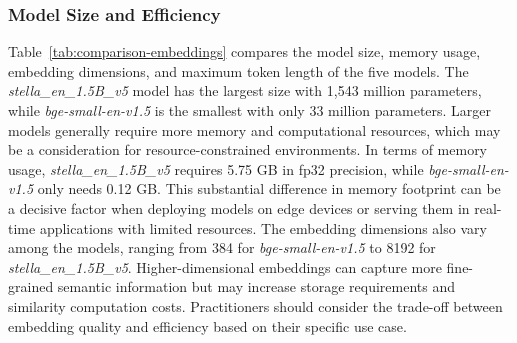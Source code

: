 \subsubsection{Model Size and Efficiency}
Table~\ref{tab:comparison-embeddings} compares the model size, memory usage, embedding dimensions, and maximum token length of the five models. 
The \textit{stella\_en\_1.5B\_v5} model has the largest size with 1,543 million parameters, while \textit{bge-small-en-v1.5} is the smallest with only 33 million parameters.
Larger models generally require more memory and computational resources, which may be a consideration for resource-constrained environments.
In terms of memory usage, \textit{stella\_en\_1.5B\_v5} requires 5.75 GB in fp32 precision, while \textit{bge-small-en-v1.5} only needs 0.12 GB.
This substantial difference in memory footprint can be a decisive factor when deploying models on edge devices or serving them in real-time applications with limited resources.
The embedding dimensions also vary among the models, ranging from 384 for \textit{bge-small-en-v1.5} to 8192 for \textit{stella\_en\_1.5B\_v5}.
Higher-dimensional embeddings can capture more fine-grained semantic information but may increase storage requirements and similarity computation costs.
Practitioners should consider the trade-off between embedding quality and efficiency based on their specific use case.

\begin{table}[ht!]
    \centering
    \noindent
    \caption{Comparison of Embedding Models}
    \label{tab:comparison-embeddings}
\end{table}

